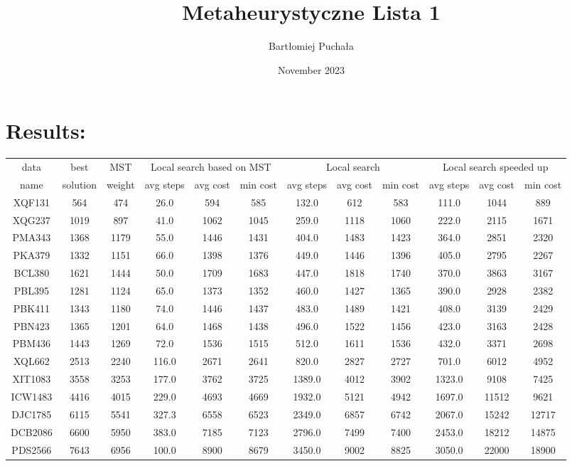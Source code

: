 \documentclass{article}
\title{Metaheurystyczne Lista 1}
\author{Bartłomiej Puchała}
\date{November 2023}
\begin{document}
\maketitle
\section{Results:}
\begin{center}
    \begin{tabular}{| c | c | c || c | c | c || c | c | c || c | c | c ||}
    \hline
    data & best & MST & \multicolumn{3}{c||}{Local search based on MST} & \multicolumn{3}{c||}{Local search} & \multicolumn{3}{c||}{Local search speeded up}\\
    \cline{4-12}
    name & solution & weight & avg steps & avg cost & min cost & avg steps & avg cost & min cost & avg steps & avg cost & min cost\\
    \hline
    \hline
    XQF131 & 564 & 474 & 26.0 & 594 & 585 & 132.0 & 612 & 583 & 111.0 & 1044 & 889\\
    \hline
    XQG237 & 1019 & 897 & 41.0 & 1062 & 1045 & 259.0 & 1118 & 1060 & 222.0 & 2115 & 1671 \\
    \hline
    PMA343 & 1368 & 1179 & 55.0 & 1446 & 1431 & 404.0 & 1483 & 1423 & 364.0 & 2851 & 2320 \\
    \hline
    PKA379 & 1332 & 1151 & 66.0 & 1398 & 1376 & 449.0 & 1446 & 1396 & 405.0 & 2795 & 2267 \\
    \hline
    BCL380 & 1621 & 1444 & 50.0 & 1709 & 1683 & 447.0 & 1818 & 1740 & 370.0 & 3863 & 3167 \\
    \hline
    PBL395 & 1281 & 1124 & 65.0 & 1373 & 1352 & 460.0 & 1427 & 1365 & 390.0 & 2928 & 2382 \\
    \hline
    PBK411 & 1343 & 1180 & 74.0 & 1446 & 1437 & 483.0 & 1489 & 1421 & 408.0 & 3139 & 2429 \\
    \hline
    PBN423 & 1365 & 1201 & 64.0 & 1468 & 1438 & 496.0 & 1522 & 1456 & 423.0 & 3163 & 2428 \\
    \hline
    PBM436 & 1443 & 1269 & 72.0 & 1536 & 1515 & 512.0 & 1611 & 1536 & 432.0 & 3371 & 2698 \\
    \hline
    XQL662 & 2513 & 2240 & 116.0 & 2671 & 2641 & 820.0 & 2827 & 2727 & 701.0 & 6012 & 4952 \\
    \hline
    XIT1083 & 3558 & 3253 & 177.0 & 3762 & 3725 & 1389.0 & 4012 & 3902 & 1323.0 & 9108 & 7425\\
    \hline
    ICW1483 & 4416 & 4015 & 229.0 & 4693 & 4669 & 1932.0 & 5121 & 4942 & 1697.0 & 11512 & 9621\\
    \hline
    DJC1785 & 6115 & 5541 & 327.3 & 6558 & 6523 & 2349.0 & 6857 & 6742 & 2067.0 & 15242 & 12717 \\
    \hline
    DCB2086 & 6600 & 5950 & 383.0 & 7185 & 7123 & 2796.0 & 7499 & 7400 & 2453.0 & 18212 & 14875 \\
    \hline
    PDS2566 & 7643 & 6956 & 100.0 & 8900 & 8679 & 3450.0 & 9002 & 8825 & 3050.0 & 22000 & 18900\\
    \hline
    \end{tabular}
\end{center}
\end{document}
